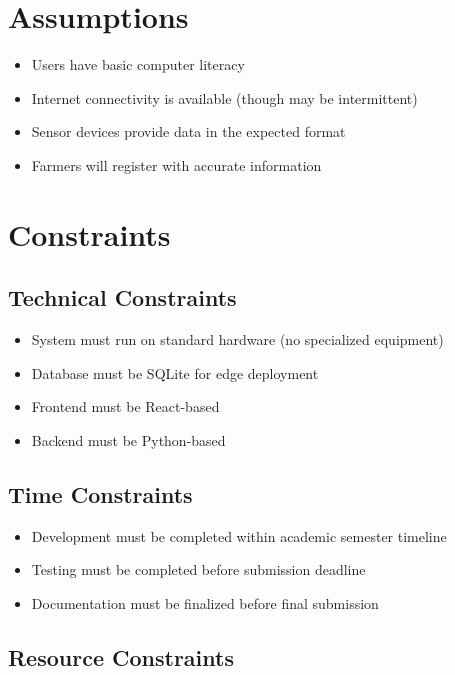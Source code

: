 \section{Assumptions}

\begin{itemize}
    \item Users have basic computer literacy
    \item Internet connectivity is available (though may be intermittent)
    \item Sensor devices provide data in the expected format
    \item Farmers will register with accurate information
\end{itemize}

\section{Constraints}

\subsection{Technical Constraints}

\begin{itemize}
    \item System must run on standard hardware (no specialized equipment)
    \item Database must be SQLite for edge deployment
    \item Frontend must be React-based
    \item Backend must be Python-based
\end{itemize}

\subsection{Time Constraints}

\begin{itemize}
    \item Development must be completed within academic semester timeline
    \item Testing must be completed before submission deadline
    \item Documentation must be finalized before final submission
\end{itemize}

\subsection{Resource Constraints}

